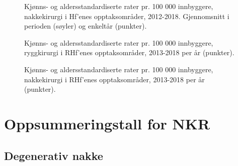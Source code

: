 \documentclass [norsk,a4paper,twoside]{article}\usepackage[]{graphicx}\usepackage[]{color}
\begin{document}
\begin{figure}[ht]
\caption{Kjønns- og aldersstandardiserte rater pr. 100 000 innbyggere, nakkekirurgi i Hf’enes opptaksområder, 2012-2018. Gjennomsnitt i perioden (søyler) og enkeltår (punkter).}
\label{fig:AA_Nakkekirurgi_BoHF1}
\end{figure}

\begin{figure}[ht]
\caption{Kjønns- og aldersstandardiserte rater pr. 100 000 innbyggere, ryggkirurgi i RHf’enes opptaksområder, 2013-2018 per år (punkter).}
\label{fig:Rygkirurgi_line1}
\end{figure}

\begin{figure}[ht]
\caption{Kjønns- og aldersstandardiserte rater pr. 100 000 innbyggere, nakkekirurgi i RHf’enes opptaksområder, 2013-2018 per år (punkter).}
\label{fig:Nakkekirurgi_line1}
\end{figure}




\clearpage



\section{Oppsummeringstall for NKR}




\subsection{Degenerativ nakke}
\end{document}
